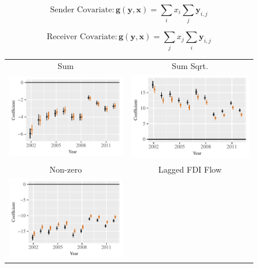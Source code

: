 \documentclass{article}
\begin{document}
$$ \text{Sender Covariate}: \bm{g(y,x)} = \sum_{i}x_i \sum_{j} \bm{y}_{i,j}$$

$$ \text{Receiver Covariate}: \bm{g(y,x)} = \sum_{j}x_j \sum_{i} \bm{y}_{i,j}$$





\begin{figure}
\centering
\begin{tabular}{c@{\hskip -.4cm}c}
Sum &
Sum Sqrt.\\
\includegraphics[height=.22\textheight, clip=true, trim=0cm .5cm 0cm .1cm]{draft_figures/rl_plots/Sum.pdf}    &
\includegraphics[height=.22\textheight, clip=true, trim=.5cm .5cm 0cm .1cm]{draft_figures/rl_plots/Sum_5.pdf}   \\
Non-zero &
Lagged FDI Flow\\
\includegraphics[height=.22\textheight, clip=true, trim=0cm .5cm 0cm .1cm]{draft_figures/rl_plots/Nonzero.pdf} &  

\end{tabular}
\end{figure}
\end{document}
